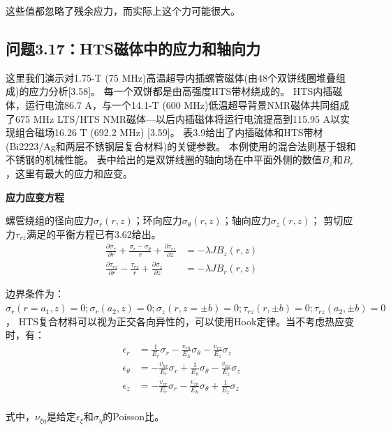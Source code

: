 这些值都忽略了残余应力，而实际上这个力可能很大。


\subsection{问题3.17：HTS磁体中的应力和轴向力}
这里我们演示对1.75-T (75 MHz)高温超导内插螺管磁体(由48个双饼线圈堆叠组成)的应力分析[3.58]。
每一个双饼都是由高强度HTS带材绕成的。
HTS内插磁体，运行电流86.7 A，与一个14.1-T (600 MHz)低温超导背景NMR磁体共同组成了675 MHz LTS/HTS
NMR磁体---以后内插磁体将运行电流提高到115.95 A以实现组合磁场16.26 T (692.2 MHz) [3.59]。
表3.9给出了内插磁体和HTS带材(Bi2223/Ag和两层不锈钢层复合材料)的关键参数。 
本例使用的混合法则基于银和不锈钢的机械性能。
表中给出的是双饼线圈的轴向场在中平面外侧的数值$B_z$和$B_r$，这里有最大的应力和应变。

\textbf{应力应变方程}

螺管绕组的径向应力$\sigma_r(r, z)$；环向应力$\sigma_\theta(r, z)$；轴向应力$\sigma_z(r, z)$；
剪切应力$\tau_{rz}$满足的平衡方程已有3.62给出。
\begin{align*}
\frac{\partial\sigma_{r}}{\partial r}+\frac{\sigma_{r}-\sigma_{\theta}}{r}+\frac{\partial\tau_{rz}}{\partial z}&=-\lambda JB_{z}(r,z)\tag{3.62a}\\%
\frac{\partial\tau_{rz}}{\partial r}-\frac{\tau_{rz}}{r}+\frac{\partial\sigma_{z}}{\partial z}&=-\lambda JB_{r}(r,z)\tag{3.62b}%
\end{align*}

边界条件为：$\sigma_r(r = a_1, z) = 0; \sigma_r(a_2, z) = 0; \sigma_z(r, z = \pm b) = 0;
\tau_{rz}(r, \pm b)=0; \tau_{rz}(a_2,\pm b)=0$，
HTS复合材料可以视为正交各向异性的，可以使用Hook定律。当不考虑热应变时，有：
\begin{subequations}
	\begin{align}
\epsilon_{r}&=\frac{1}{E_{r}}\sigma_{r}-\frac{v_{rh}}{E_{h}}\sigma_{\theta}-\frac{v_{rz}}{E_{z}}\sigma_{z}\\%
\epsilon_{\theta}&=-\frac{v_{hr}}{E_{r}}\sigma_{r}+\frac{1}{E_{h}}\sigma_{\theta}-\frac{v_{hz}}{E_{z}}\sigma_{z}\\%
\epsilon_{z}&=-\frac{v_{zr}}{E_{r}}\sigma_{r}-\frac{v_{zh}}{E_{h}}\sigma_{\theta}+\frac{1}{E_{z}}\sigma_{z}\\%
	\end{align}
\end{subequations}

式中，$\nu_{\xi\eta}$是给定$\epsilon_\xi$和$\sigma_\eta$的Poisson比。

